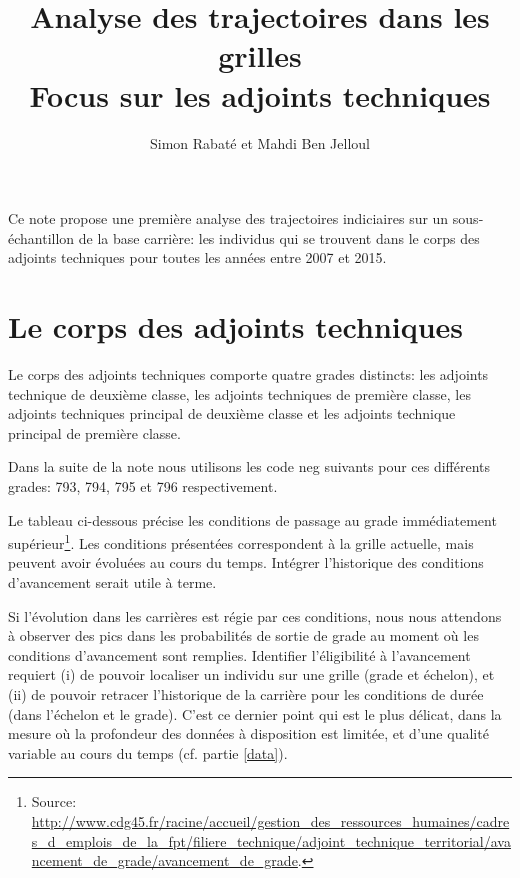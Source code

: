 \documentclass[11pt,a4paper]{article}
\begin{document}
\title{Analyse des trajectoires dans les grilles \\ Focus sur les adjoints techniques}


\author{Simon Rabat\'e et Mahdi Ben Jelloul}


\maketitle

Ce note propose une première analyse des trajectoires indiciaires sur un sous-échantillon de la base carrière: les individus qui se trouvent dans le corps des adjoints techniques pour toutes les années entre 2007 et 2015. 

\renewcommand*\contentsname{\textsc{Plan de la note}}
\tableofcontents

\clearpage


\section{Le corps des adjoints techniques}

Le corps des adjoints techniques comporte quatre grades distincts: les adjoints technique de deuxième classe, les adjoints techniques de première classe, les adjoints techniques principal de deuxième classe et les adjoints technique principal de première classe. 

Dans la suite de la note nous utilisons les code neg suivants pour ces différents grades: 793, 794, 795 et 796 respectivement. 

Le tableau ci-dessous précise les conditions de passage au grade immédiatement supérieur\footnote{Source: \url{http://www.cdg45.fr/racine/accueil/gestion_des_ressources_humaines/cadres_d_emplois_de_la_fpt/filiere_technique/adjoint_technique_territorial/avancement_de_grade/avancement_de_grade}.}. Les conditions présentées correspondent à la grille actuelle, mais peuvent avoir évoluées au cours du temps. Intégrer l'historique des conditions d'avancement serait utile à terme. 

Si l'évolution dans les carrières est régie par ces conditions, nous nous attendons à observer des pics dans les probabilités de sortie de grade au moment où les conditions d'avancement sont remplies. Identifier l'éligibilité à l'avancement requiert (i) de pouvoir localiser un individu sur une grille (grade et échelon), et (ii) de pouvoir retracer l'historique de la carrière pour les conditions de durée (dans l'échelon et le grade). C'est ce dernier point qui est le plus délicat, dans la mesure où la profondeur des données à disposition est limitée, et d'une qualité variable au cours du temps (cf. partie \ref{data}). 
\end{document}
